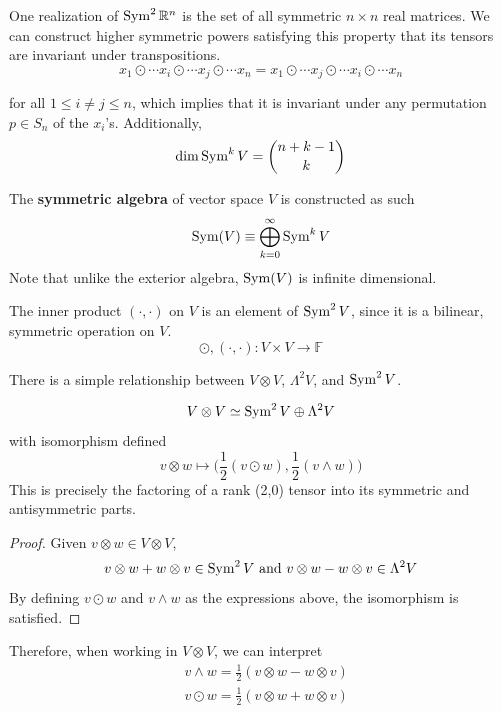   One realization of $\operatorname{Sym}^2 \mathbb{R}^n$ is the set of all symmetric $n \times n$ real matrices. We can construct higher symmetric powers satisfying this property that its tensors are invariant under transpositions. 
  \[x_1 \odot \cdots x_i \odot \cdots x_j \odot \cdots x_n = x_1 \odot \cdots x_j \odot \cdots x_i \odot \cdots x_n\]

  for all $1 \leq i \neq j \leq n$, which implies that it is invariant under any permutation $p \in S_n$ of the $x_i$'s. Additionally, 
  \[\dim{\operatorname{Sym}^k V} = \binom{n+k-1}{k}\]

  \begin{definition}
    The \textbf{symmetric algebra} of vector space $V$ is constructed as such 
    \[\operatorname{Sym} (V) \equiv \bigoplus_{k=0}^\infty \operatorname{Sym}^k V\]
    Note that unlike the exterior algebra, $\operatorname{Sym}(V)$ is infinite dimensional. 
  \end{definition}

  \begin{example}
    The inner product $(\cdot, \cdot)$ on $V$ is an element of $\operatorname{Sym}^2 V$, since it is a bilinear, symmetric operation on $V$. 
    \[\odot, (\cdot, \cdot): V \times V \longrightarrow \mathbb{F}\]
  \end{example}

  There is a simple relationship between $V \otimes V$, $\Lambda^2 V$, and $\operatorname{Sym}^2 V$. 

  \begin{theorem}
    \[V \otimes V \simeq \operatorname{Sym}^2 V \oplus \Lambda^2 V\]
    with isomorphism defined
    \[v \otimes w \mapsto \Big( \frac{1}{2} (v \odot w), \frac{1}{2} (v \wedge w) \Big)\]
    This is precisely the factoring of a rank (2,0) tensor into its symmetric and antisymmetric parts. 
  \end{theorem}
  \begin{proof}
    Given $v \otimes w \in V \otimes V$, 
    \[v \otimes w + w \otimes v \in \operatorname{Sym}^2 V \text{ and } v \otimes w - w \otimes v \in \Lambda^2 V\]
    By defining $v \odot w$ and $v \wedge w$ as the expressions above, the isomorphism is satisfied. 
  \end{proof}

  Therefore, when working in $V \otimes V$, we can interpret 
  \begin{align*}
    & v \wedge w = \frac{1}{2} (v \otimes w - w \otimes v) \\
    & v \odot w = \frac{1}{2} (v \otimes w + w \otimes v) 
  \end{align*}

